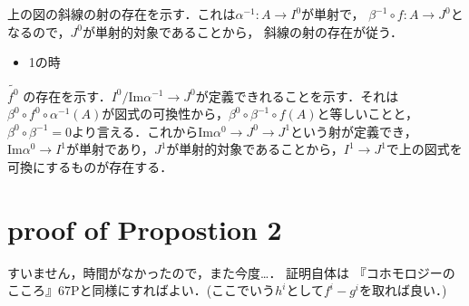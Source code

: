 \documentclass{ujarticle}
\begin{document}

上の図の斜線の射の存在を示す．これは$\alpha^{-1}:A \to I^0$が単射で，
$\beta^{-1} \circ f : A \to J^0$となるので，$J^0$が単射的対象であることから，
斜線の射の存在が従う．

\begin{itemize}
  \item 1の時
\end{itemize}


$\tilde{f^0}$ の存在を示す．$I^0/\mathrm{Im}\alpha^{-1} \to J^0$が定義できれることを示す．それは$\beta^{0} \circ f^{0} \circ \alpha^{-1}(A) $が図式の可換性から，$ \beta^{0} \circ \beta^{-1} \circ f(A)$と等しいことと，
$ \beta^{0} \circ \beta^{-1} =0$より言える．これから$\mathrm{Im}\alpha^0 \to J^0 \to J^1$という射が定義でき，$\mathrm{Im}\alpha^0 \to I^1$が単射であり，$J^1$が単射的対象であることから，$I^1 \to J^1$で上の図式を可換にするものが存在する．

\section{proof of Propostion 2}
\label{sec:proof of Propostion 2}
すいません，時間がなかったので，また今度…．
証明自体は
『コホモロジーのこころ』67Pと同様にすればよい．(ここでいう$h^i$として$f^i - g^i$を取れば良い．)
\end{document}
